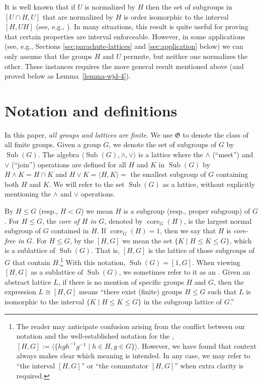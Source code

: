 \documentclass[11pt]{amsart}
\theoremstyle{plain}
\theoremstyle{definition}
\theoremstyle{remark}
\numberwithin{theorem}{section}
\numberwithin{claim}{section}
\numberwithin{equation}{section}
\numberwithin{conjecture}{section}
\newcommand{\<}{\ensuremath{\langle}}
\renewcommand{\>}{\ensuremath{\rangle}}
\renewcommand{\leq}{\ensuremath{\leqslant}}
\newcommand{\meet}{\ensuremath{\wedge}}
\newcommand{\join}{\ensuremath{\vee}}
\newcommand{\Sub}{\ensuremath{\operatorname{Sub}}}
\newcommand{\core}{\ensuremath{\operatorname{core}}}
\newcommand{\FLRP}{{\small FLRP}}
\newcommand{\0}{\ensuremath{\mathbf{0}}}
\newcommand{\1}{\ensuremath{\mathbf{1}}}
\newcommand{\2}{\ensuremath{\mathbf{2}}}
\newcommand{\3}{\ensuremath{\mathbf{3}}}
\newcommand{\4}{\ensuremath{\mathbf{4}}}
\newcommand{\5}{\ensuremath{\mathbf{5}}}
\newcommand{\G}{\ensuremath{\mathfrak{G}}}
\begin{document}
It is well known that if $U$ is normalized by $H$ then the
set %
of subgroups in $[U\cap H, U]$ that are normalized by $H$ is order isomorphic
to the interval $[H, UH]$ (see, e.g.,
\cite{Borner:1999}). In many situations, this result is quite useful for proving
that certain properties are interval enforceable.  However, in some applications
(see, e.g., Sections \ref{sec:parachute-lattices} and \ref{sec:application}
below) %
we can only assume that the groups $H$ and $U$ permute, but neither one normalizes
the other.
These instances requires the more general result mentioned above (and proved
below as Lemma~\ref{lemma-wjd-4}). 

\section{Notation and definitions}
\label{sec:notation-definitions}
In this paper, \emph{all groups and lattices are finite}.  We use 
$\G$ to denote the class of all finite groups.
Given a group $G$, we denote the set of subgroups of $G$ by $\Sub(G)$.  The
algebra $\<\Sub(G), \meet, \join\>$ is a lattice where the $\meet$ (``meet'') and
$\join$ (``join'') operations are defined for all $H$ and $K$ in $\Sub(G)$ by
$H\meet K = H\cap K$ and $H\join K = \<H, K\> = $ the smallest subgroup of $G$
containing both $H$ and $K$.  We will refer to the set
$\Sub(G)$ as a lattice, without explicitly mentioning the $\meet$ and
$\join$ operations.

By $H \leq G$ (resp.,
$H < G$) we mean $H$ is a subgroup (resp., proper subgroup) of $G$.
For $H\leq G$, the
\emph{core of $H$ in $G$}, denoted by $\core_G(H)$, is the largest normal subgroup of $G$
contained in $H$.
If $\core_G(H)=1$, then we say that $H$ is \emph{core-free in $G$}.
For $H\leq G$,
by the  $[H, G]$ we mean 
the set $\{K \mid H\leq K \leq G\}$, which is a
sublattice of $\Sub(G)$.
That is, $[H,G]$ is the lattice of those subgroups of $G$ that contain 
$H$.\footnote{The reader may anticipate confusion arising from the
  conflict between our notation and the well-established notation for the
  , $[H,G] := \<\{hgh^{-1}g^{-1} \mid h\in H, g\in
  G\}\>$.  However, we have found that context always makes clear which meaning
  is intended.  In any case, we may refer to ``the interval $[H,G]$'' or ``the
  commutator $[H,G]$'' when extra clarity is required.} 
With this notation, $\Sub(G)=[1,G]$.
When viewing $[H,G]$ as a
sublattice of $\Sub(G)$, we sometimes refer to it as an . 
Given an abstract lattice $L$, if there is no mention of specific groups $H$ and
$G$, then the expression $L \cong [H, G]$ means ``there exist (finite) groups $H
\leq G$ such that $L$ is isomorphic to the interval $\{K \mid H\leq K \leq G\}$ in
the subgroup lattice of $G$.''  
\end{document}
